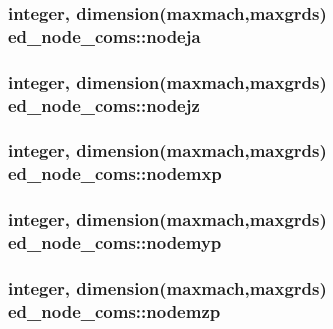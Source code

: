 \subsubsection[{nodeja}]{\setlength{\rightskip}{0pt plus 5cm}integer, dimension(maxmach,maxgrds) ed\+\_\+node\+\_\+coms\+::nodeja}\label{namespaceed__node__coms_a116c403afd361d69151547dc435f4fbb}
\hypertarget{namespaceed__node__coms_ae1f44d8dd2031c7740623b475928d5f2}{}
\subsubsection[{nodejz}]{\setlength{\rightskip}{0pt plus 5cm}integer, dimension(maxmach,maxgrds) ed\+\_\+node\+\_\+coms\+::nodejz}\label{namespaceed__node__coms_ae1f44d8dd2031c7740623b475928d5f2}
\hypertarget{namespaceed__node__coms_a5fdf4fa217cc15fdab945bf67190a545}{}
\subsubsection[{nodemxp}]{\setlength{\rightskip}{0pt plus 5cm}integer, dimension(maxmach,maxgrds) ed\+\_\+node\+\_\+coms\+::nodemxp}\label{namespaceed__node__coms_a5fdf4fa217cc15fdab945bf67190a545}
\hypertarget{namespaceed__node__coms_ad31a7ed8c12f8db5df56c78b9682dc23}{}
\subsubsection[{nodemyp}]{\setlength{\rightskip}{0pt plus 5cm}integer, dimension(maxmach,maxgrds) ed\+\_\+node\+\_\+coms\+::nodemyp}\label{namespaceed__node__coms_ad31a7ed8c12f8db5df56c78b9682dc23}
\hypertarget{namespaceed__node__coms_aa2430afe20235a8503a91fe9824f1d6b}{}
\subsubsection[{nodemzp}]{\setlength{\rightskip}{0pt plus 5cm}integer, dimension(maxmach,maxgrds) ed\+\_\+node\+\_\+coms\+::nodemzp}\label{namespaceed__node__coms_aa2430afe20235a8503a91fe9824f1d6b}
\hypertarget{namespaceed__node__coms_ae516cc09ceda6c63673e5972aa6a6963}{}

